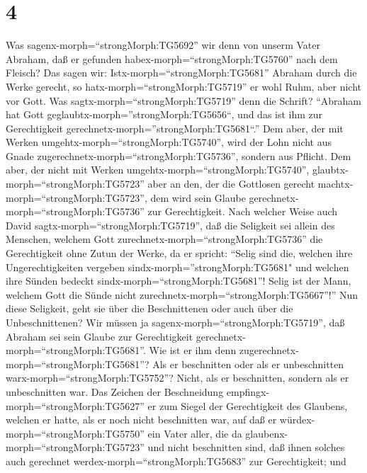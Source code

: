 \hypertarget{section-3}{%
\section{4}\label{section-3}}

 Was sagenx-morph=``strongMorph:TG5692'' wir denn von unserm
Vater Abraham, daß er gefunden habex-morph=``strongMorph:TG5760'' nach
dem Fleisch?  Das sagen wir:
Istx-morph=``strongMorph:TG5681'' Abraham durch die Werke gerecht, so
hatx-morph=``strongMorph:TG5719'' er wohl Ruhm, aber nicht vor Gott.
 Was sagtx-morph=``strongMorph:TG5719'' denn die Schrift?
``Abraham hat Gott geglaubtx-morph=''strongMorph:TG5656``, und das ist
ihm zur Gerechtigkeit gerechnetx-morph=''strongMorph:TG5681``.''
 Dem aber, der mit Werken
umgehtx-morph=``strongMorph:TG5740'', wird der Lohn nicht aus Gnade
zugerechnetx-morph=``strongMorph:TG5736'', sondern aus Pflicht.
 Dem aber, der nicht mit Werken
umgehtx-morph=``strongMorph:TG5740'',
glaubtx-morph=``strongMorph:TG5723'' aber an den, der die Gottlosen
gerecht machtx-morph=``strongMorph:TG5723'', dem wird sein Glaube
gerechnetx-morph=``strongMorph:TG5736'' zur Gerechtigkeit. 
Nach welcher Weise auch David sagtx-morph=``strongMorph:TG5719'', daß
die Seligkeit sei allein des Menschen, welchem Gott
zurechnetx-morph=``strongMorph:TG5736'' die Gerechtigkeit ohne Zutun der
Werke, da er spricht:  ``Selig sind die, welchen ihre
Ungerechtigkeiten vergeben sindx-morph=''strongMorph:TG5681" und welchen
ihre Sünden bedeckt sindx-morph=``strongMorph:TG5681''! 
Selig ist der Mann, welchem Gott die Sünde nicht
zurechnetx-morph=``strongMorph:TG5667''!''  Nun diese
Seligkeit, geht sie über die Beschnittenen oder auch über die
Unbeschnittenen? Wir müssen ja sagenx-morph=``strongMorph:TG5719'', daß
Abraham sei sein Glaube zur Gerechtigkeit
gerechnetx-morph=``strongMorph:TG5681''.  Wie ist er ihm
denn zugerechnetx-morph=``strongMorph:TG5681''? Als er beschnitten oder
als er unbeschnitten warx-morph=``strongMorph:TG5752''? Nicht, als er
beschnitten, sondern als er unbeschnitten war.  Das Zeichen
der Beschneidung empfingx-morph=``strongMorph:TG5627'' er zum Siegel der
Gerechtigkeit des Glaubens, welchen er hatte, als er noch nicht
beschnitten war, auf daß er würdex-morph=``strongMorph:TG5750'' ein
Vater aller, die da glaubenx-morph=``strongMorph:TG5723'' und nicht
beschnitten sind, daß ihnen solches auch gerechnet
werdex-morph=``strongMorph:TG5683'' zur Gerechtigkeit;  und
